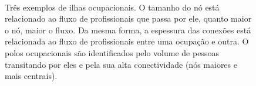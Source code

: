 \documentclass[
  article,
  11pt,
  a4paper,
  english,
  brazil,
  sumario=tradicional]{abntex2}
\begin{document}
\begin{figure}[ht]
    \centering
    \\    
    \caption{Três exemplos de ilhas ocupacionais. O tamanho do nó está relacionado ao fluxo de profissionais que passa por ele, quanto maior o nó, maior o fluxo. Da mesma forma, a espessura das conexões está relacionada ao fluxo de profissionais entre uma ocupação e outra. O polos ocupacionais são identificados pelo volume de pessoas transitando por eles e pela sua alta conectividade (nós maiores e mais centrais).}
    \label{fig:ex-ilhas-ocupacionais}
\end{figure}
\end{document}
